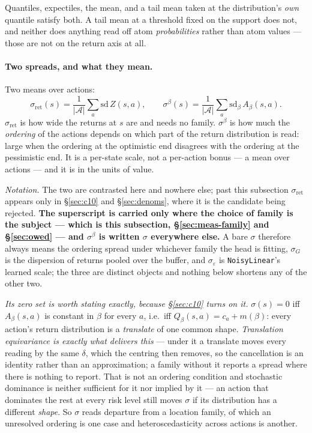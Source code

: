\documentclass{article}
\newcommand{\actions}{\mathcal{A}}
\newcommand{\sret}{\sigma_{\mathrm{ret}}}
\newcommand{\srank}{\sigma}
\newcommand{\srankb}{\sigma^{\beta}}
\newcommand{\snorm}{\sigma_{G}}
\newcommand{\snoise}{\sigma_{\varepsilon}}
\begin{document}
Quantiles, expectiles, the mean, and a tail mean taken at the distribution's \emph{own} quantile
satisfy both. A tail mean at a threshold fixed on the support does not, and neither does anything
read off atom \emph{probabilities} rather than atom values --- those are not on the return axis
at all.

\paragraph{Two spreads, and what they mean.} Two means over actions:
\[
  \sret(s) = \frac{1}{|\actions|}\sum_a \mathrm{sd}\,Z(s,a),
  \qquad
  \srankb(s) = \frac{1}{|\actions|}\sum_a \mathrm{sd}_\beta\, A_\beta(s,a).
\]
$\sret$ is how wide the returns at $s$ are and needs no family. $\srankb$ is how much the
\emph{ordering} of the actions depends on which part of the return distribution is read: large
when the ordering at the optimistic end disagrees with the ordering at the pessimistic end. It is
a per-state scale, not a per-action bonus --- a mean over actions --- and it is in the units of
value.

\emph{Notation.} The two are contrasted here and nowhere else; past this subsection $\sret$
appears only in \S\ref{sec:c10} and \S\ref{sec:denoms}, where it is the candidate being rejected.
\textbf{The superscript is carried only where the choice of family is the subject --- which is
this subsection, \S\ref{sec:meas-family} and \S\ref{sec:owed} --- and $\srankb$ is written
$\srank$ everywhere else.} A bare $\srank$ therefore always means the ordering spread under
whichever family the head is fitting, $\snorm$ is the dispersion of returns pooled over the
buffer, and $\snoise$ is \texttt{NoisyLinear}'s learned scale; the three are distinct objects and
nothing below shortens any of the other two.

\emph{Its zero set is worth stating exactly, because \S\ref{sec:c10} turns on it.}
$\srank(s) = 0$ iff $A_\beta(s,a)$ is constant in $\beta$ for every $a$, i.e.\ iff
$Q_\beta(s,a) = c_a + m(\beta)$: every action's return distribution is a \emph{translate} of one
common shape. \emph{Translation equivariance is exactly what delivers this} --- under it a
translate moves every reading by the same $\delta$, which the centring then removes, so the
cancellation is an identity rather than an approximation; a family without it reports a spread
where there is nothing to report. That is not an ordering condition and stochastic dominance is neither sufficient
for it nor implied by it --- an action that dominates the rest at every risk level still moves
$\srank$ if its distribution has a different \emph{shape}. So $\srank$ reads departure from a
location family, of which an unresolved ordering is one case and heteroscedasticity across
actions is another.
\end{document}
